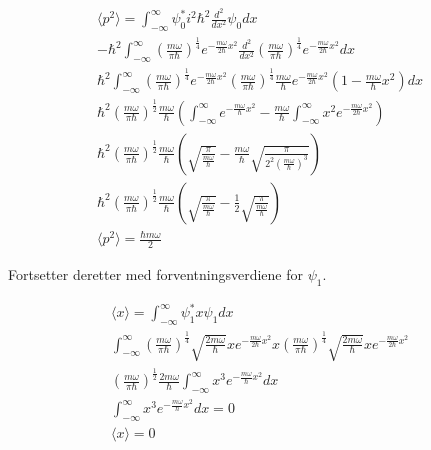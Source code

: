 \documentclass[11pt, A4paper,norsk]{article}
\begin{document}
				\begin{gather*}
\langle p^2 \rangle = \int_{- \infty}^{\infty} \psi_0^{*} i^2 \hbar^2 \frac{d^2}{dx^2} \psi_0 dx \\
- \hbar^2 \int_{- \infty}^{\infty} \left( \frac{m \omega}{\pi \hbar} \right)^{\frac{1}{4}} e^{- \frac{m \omega}{2 \hbar} x^2} \frac{d^2}{dx^2} \left( \frac{m \omega}{\pi \hbar} \right)^{\frac{1}{4}} e^{- \frac{m \omega}{2 \hbar} x^2} dx \\
\hbar^2 \int_{- \infty}^{\infty} \left( \frac{m \omega}{\pi \hbar} \right)^{\frac{1}{4}} e^{- \frac{m \omega}{2 \hbar} x^2} \left( \frac{m \omega}{\pi \hbar} \right)^{\frac{1}{4}} \frac{m \omega}{\hbar} e^{- \frac{m \omega}{2 \hbar} x^2} \left( 1 - \frac{m \omega}{\hbar} x^2 \right) dx \\
\hbar^2 \left( \frac{m \omega}{\pi \hbar} \right)^{\frac{1}{2}} \frac{m \omega}{\hbar} \left( \int_{- \infty}^{\infty} e^{- \frac{m \omega}{\hbar} x^2} - \frac{m \omega}{\hbar} \int_{- \infty}^{\infty} x^2 e^{- \frac{m \omega}{2 \hbar} x^2} \right) \\
\hbar^2 \left( \frac{m \omega}{\pi \hbar} \right)^{\frac{1}{2}} \frac{m \omega}{\hbar} \left( \sqrt{\frac{\pi}{\frac{m \omega}{\hbar}}} - \frac{m \omega}{\hbar} \sqrt{\frac{\pi}{2^2 \left( \frac{m \omega}{\hbar} \right)^{3}}} \right) \\
\hbar^2 \left( \frac{m \omega}{\pi \hbar} \right)^{\frac{1}{2}} \frac{m \omega}{\hbar} \left( \sqrt{\frac{\pi}{\frac{m \omega}{\hbar}}} - \frac{1}{2} \sqrt{\frac{\pi}{\frac{m \omega}{\hbar}}} \right) \\
\langle p^2 \rangle = \frac{\hbar m \omega}{2}
				\end{gather*}
				\begin{flushleft}
Fortsetter deretter med forventningsverdiene for $\psi_1$.
				\end{flushleft}
				\begin{gather*}
\langle x \rangle = \int_{- \infty}^{\infty} \psi_1^{*} x \psi_1 dx \\
\int_{- \infty}^{\infty} \left( \frac{m \omega}{\pi \hbar} \right)^{\frac{1}{4}} \sqrt{\frac{2 m \omega}{\hbar}} x e^{- \frac{m \omega}{2 \hbar} x^2} x \left( \frac{m \omega}{\pi \hbar} \right)^{\frac{1}{4}} \sqrt{\frac{2 m \omega}{\hbar}} x e^{- \frac{m \omega}{2 \hbar} x^2} \\
\left( \frac{m \omega}{\pi \hbar} \right)^{\frac{1}{2}} \frac{2 m \omega}{\hbar} \int_{- \infty}^{\infty} x^3 e^{- \frac{m \omega}{\hbar} x^2} dx \\
\int_{- \infty}^{\infty} x^3 e^{- \frac{m \omega}{\hbar} x^2} dx = 0 \\
\langle x \rangle = 0
				\end{gather*}
\end{document}

